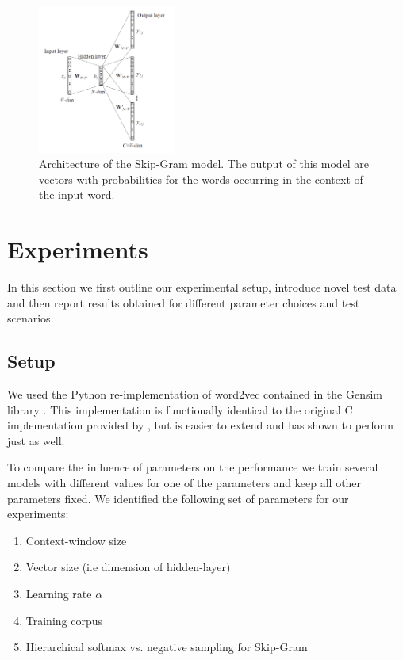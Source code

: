 \documentclass[conference]{IEEEtran}
\begin{document}
\begin{figure}[t]
\centering
\includegraphics[width=0.4\textwidth]{skip-gram}
\caption{Architecture of the Skip-Gram model. The output of this model are vectors with probabilities 
for the words occurring in the context of the input word.}
\label{fig:skip}
\end{figure}


\section{Experiments}
\label{sec:exp}

In this section we first outline our experimental setup, introduce novel test data
 and then report results obtained for different parameter choices and test scenarios. 

\subsection{Setup}
We used the Python re-implementation of word2vec contained in the Gensim library 
\cite{rehurek_lrec}. This implementation is functionally identical to the original 
C implementation provided by \cite{mikolov2013efficient}, but is easier to extend and has 
shown to perform just as well. 

To compare the influence of parameters on the performance we train several models
with different values for one of the parameters and keep all other parameters fixed. We 
identified the following set of parameters for our experiments:
\begin{enumerate}
\item Context-window size
\item Vector size (i.e dimension of hidden-layer)
\item Learning rate $\alpha$
\item Training corpus
\item Hierarchical softmax vs. negative sampling for Skip-Gram
\end{enumerate}
\end{document}
